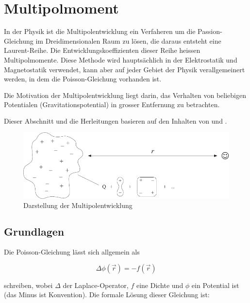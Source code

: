 %
%
%
%
\section{Multipolmoment
\label{planet:section:multipol}}
In der Physik ist die Multipolentwicklung ein Verfaheren um die Passion-Gleichung im Dreidimensionalen Raum zu lösen, die daraus entsteht eine Laurent-Reihe.
Die Entwicklungskoeffizienten dieser Reihe heissen Multipolmomente.
Diese Methode wird hauptsächlich in der Elektrostatik und Magnetostatik verwendet, kann aber auf jeder Gebiet der Physik verallgemeinert werden, in dem die Poisson-Gleichung vorhanden ist.

Die Motivation der Multipolentwicklung liegt darin, das Verhalten von beliebigen Potentialen (Gravitationspotential) in grosser Entfernung zu betrachten.

Dieser Abschnitt und die Herleitungen basieren auf den Inhalten von \cite{planet:multi} und \cite{planet:quadro}.

\begin{figure}[h!]
    \centering
    \includegraphics[width=\linewidth]{papers/planet/pictures/Multipol.pdf}
    \caption{Darstellung der Multipolentwicklung
        \label{planet:fig:multipol}}
\end{figure}

\subsection{Grundlagen
\label{planet:subsection:grundlagen}}

Die Poisson-Gleichung lässt sich allgemein als

\begin{equation*}
\Delta \phi (\vec{r}) = - f (\vec{r})
\end{equation*}

\noindent
schreiben, wobei \(\Delta\) der Laplace-Operator, \(f\) eine Dichte und \(\phi\) ein Potential ist (das Minus ist Konvention).
Die formale Lösung dieser Gleichung ist:

